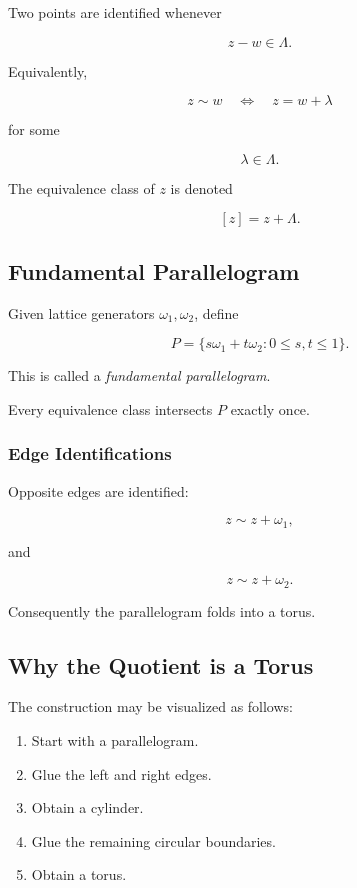 \documentclass[12pt,a4paper]{article}
\theoremstyle{notespace}
\begin{document}
Two points are identified whenever

\[
z-w\in\Lambda.
\]

Equivalently,

\[
z\sim w
\quad
\Longleftrightarrow
\quad
z=w+\lambda
\]

for some

\[
\lambda\in\Lambda.
\]

The equivalence class of \(z\) is denoted

\[
[z]
=
z+\Lambda.
\]

\subsection{Fundamental Parallelogram}

Given lattice generators \(\omega_1,\omega_2\), define

\[
P
=
\{
s\omega_1+t\omega_2
:
0\le s,t\le1
\}.
\]

This is called a \emph{fundamental parallelogram}.

Every equivalence class intersects \(P\) exactly once.

\subsubsection*{Edge Identifications}

Opposite edges are identified:

\[
z
\sim
z+\omega_1,
\]

and

\[
z
\sim
z+\omega_2.
\]

Consequently the parallelogram folds into a torus.

\subsection{Why the Quotient is a Torus}

The construction may be visualized as follows:

\begin{enumerate}
	\item Start with a parallelogram.
	\item Glue the left and right edges.
	\item Obtain a cylinder.
	\item Glue the remaining circular boundaries.
	\item Obtain a torus.
\end{enumerate}
\end{document}
